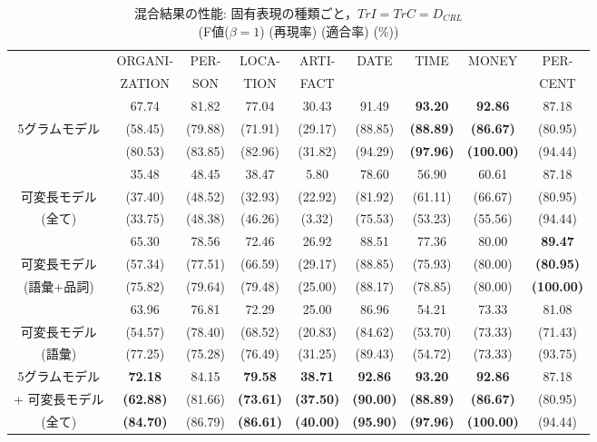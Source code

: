 \begin{table*}
\begin{scriptsize}
\begin{center}
\caption{混合結果の性能: 固有表現の種類ごと，$TrI=TrC=D_{CRL}$\\
	 (F値($\beta=1$) (再現率) (適合率) (\%))}
\label{tab:res-netag}
\hspace*{-.3cm}
\begin{tabular}{|c||c|c|c|c|c|c|c|c|} \hline
        & ORGANI- & PER- & LOCA- & ARTI- & DATE & TIME & MONEY & PER- \\ 
        & ZATION &  SON	   & TION & FACT &  &  &  		& CENT \\ \hline\hline
	& 67.74 	& 81.82 & 77.04   & 30.43   & 91.49 & {\bf 93.20} & {\bf 92.86} & 87.18 \\ 
5グラムモデル  	
	& (58.45) & (79.88) &	(71.91) & (29.17) & (88.85) & {\bf (88.89)} & {\bf (86.67)} & (80.95) \\ 
	& (80.53) & (83.85) &	(82.96) & (31.82) & (94.29) & {\bf (97.96)} & {\bf (100.00)} & (94.44) \\ \hline

	& 35.48 	& 48.45 & 38.47   & 5.80   & 78.60 & 56.90 & 60.61 & 87.18 \\ 
可変長モデル 
	& (37.40) & (48.52) &	(32.93) & (22.92) & (81.92) & (61.11) & (66.67) & (80.95) \\ 
(全て)	& (33.75) & (48.38) &	(46.26) & (3.32) & (75.53) & (53.23) & (55.56) & (94.44) \\ \hline

	& 65.30     & 78.56    & 72.46   & 26.92   & 88.51  & 77.36  & 80.00    & {\bf 89.47} \\ 
可変長モデル 
	& (57.34)   & (77.51)  &(66.59) & (29.17) & (88.85) & (75.93) & (80.00) & {\bf (80.95)} \\ 
(語彙+品詞)
	& (75.82)   & (79.64)  &(79.48) & (25.00) & (88.17) & (78.85) & (80.00) & {\bf (100.00)} \\ \hline

	& 63.96     & 76.81    & 72.29   & 25.00   & 86.96  & 54.21  & 73.33 & 81.08 \\ 
可変長モデル 
	& (54.57)   & (78.40)  &(68.52) & (20.83) & (84.62) & (53.70) & (73.33) & (71.43) \\ 
(語彙)
	& (77.25)   & (75.28)  &(76.49) & (31.25) & (89.43) & (54.72) & (73.33) & (93.75) \\ \hline\hline

5グラムモデル  
	& {\bf 72.18} 	& 84.15 & {\bf 79.58}   & {\bf 38.71}   & {\bf 92.86} & {\bf 93.20} & {\bf 92.86} & 87.18 \\ 
+ 可変長モデル 
	& {\bf (62.88)} & (81.66) & {\bf (73.61)} & {\bf (37.50)} & {\bf (90.00)} & {\bf (88.89)} & {\bf (86.67)} & (80.95)
									 \\ 
(全て)	& {\bf (84.70)} & (86.79) & {\bf (86.61)} & {\bf (40.00)} & {\bf (95.90)} & {\bf (97.96)} & {\bf (100.00)} & (94.44)
									 \\ 	\hline


\end{tabular}
\end{center}
\end{scriptsize}
\end{table*}
